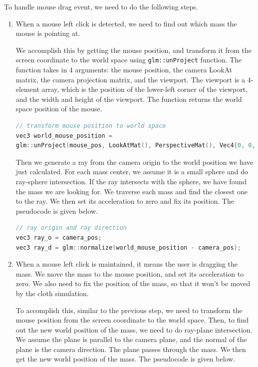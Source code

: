 \documentclass[acmtog]{acmart}
\begin{document}
To handle mouse drag event, we need to do the following steps.

\begin{enumerate}
	\item When a mouse left click is detected, we need to find out which mass the mouse is pointing at. 
	
	We accomplish this by getting the mouse position, and transform it from the screen coordinate to the world space using \verb|glm::unProject| function. The function takes in 4 arguments: the mouse position, the camera LookAt matrix, the camera projection matrix, and the viewport. The viewport is a 4-element array, which is the position of the lower-left corner of the viewport, and the width and height of the viewport. The function returns the world space position of the mouse.

	\begin{lstlisting}[language=C++]
// transform mouse position to world space
vec3 world_mouse_position = 
glm::unProject(mouse_pos, LookAtMat(), PerspectiveMat(), Vec4{0, 0, screen_width, screen_height});
	\end{lstlisting}
	
	Then we generate a ray from the camera origin to the world position we have just calculated. For each mass center, we assume it is a small sphere and do ray-sphere intersection. If the ray intersects with the sphere, we have found the mass we are looking for. We traverse each mass and find the closest one to the ray. We then set its acceleration to zero and fix its position. The pseudocode is given below.

	\begin{lstlisting}[language=C++]
// ray origin and ray direction
vec3 ray_o = camera_pos;
vec3 ray_d = glm::normalize(world_mouse_position - camera_pos);
	\end{lstlisting}

	\item When a mouse left click is maintained, it means the user is dragging the mass. We move the mass to the mouse position, and set its acceleration to zero. We also need to fix the position of the mass, so that it won't be moved by the cloth simulation.
	
	To accomplish this, similar to the previous step, we need to transform the mouse position from the screen coordinate to the world space. Then, to find out the new world position of the mass, we need to do ray-plane intersection. We assume the plane is parallel to the camera plane, and the normal of the plane is the camera direction. The plane passes through the mass. We then get the new world position of the mass. The pseudocode is given below.


\end{enumerate}
\end{document}
